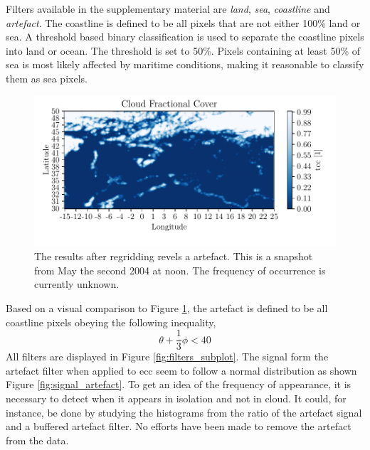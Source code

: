 Filters available in the supplementary material are \textit{land}, \textit{sea}, \textit{coastline} and \textit{artefact}. The coastline is defined to be all pixels that are not either 100\% land or sea. A threshold based binary classification is used to separate the coastline pixels into land or ocean. The threshold is set to 50\%. Pixels containing at least 50\% of sea is most likely affected by maritime conditions, making it reasonable to classify them as sea pixels.
\begin{figure}
    \centering
    \includegraphics{python_figs/example_artefact.pdf}
    \caption[Artefact in European Cloud Cover dataset.]{The results after regridding revels a artefact. This is a snapshot from May the second 2004 at noon. The frequency of occurrence is currently unknown.}
    \label{fig:example_artefact}
\end{figure}
Based on a visual comparison to Figure \ref{fig:example_artefact}, the artefact is defined to be all coastline pixels obeying the following inequality,  %
\begin{equation} \label{eq:artefact_condition}
    \theta + \frac{1}{3}\phi < 40
\end{equation}
All filters are displayed in Figure \ref{fig:filters_subplot}. 
The signal form the artefact filter when applied to \acrshort{ecc} seem to follow a normal distribution as shown Figure \ref{fig:signal_artefact}. To get an idea of the frequency of appearance, it is necessary to detect when it appears in isolation and not in cloud. It could, for instance, be done by studying the histograms from the ratio of the artefact signal and a buffered artefact filter.
No efforts have been made to remove the artefact from the data. %


